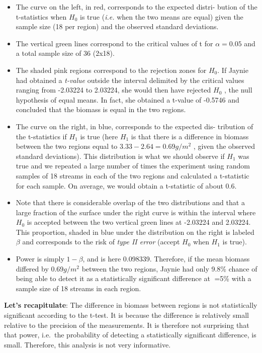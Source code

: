 \documentclass[
  12pt,
]{book}
\providecommand{\tightlist}{%
  \setlength{\itemsep}{0pt}\setlength{\parskip}{0pt}}
\begin{document}
\begin{itemize}
\tightlist
\item
  The curve on the left, in red, corresponds to the expected distri- bution of the t-statistics when \(H_0\) is true (\emph{i.e.} when the two means are equal) given the sample size (18 per region) and the observed standard deviations.
\item
  The vertical green lines correspond to the critical values of t for \(\alpha = 0.05\) and a total sample size of 36 (2x18).
\item
  The shaded pink regions correspond to the rejection zones for \(H_0\). If Jaynie had obtained a \emph{t-value} outside the interval delimited by the critical values ranging from -2.03224 to 2.03224, she would then have rejected \(H_0\) , the null hypothesis of equal means. In fact, she obtained a t-value of -0.5746 and concluded that the biomass is equal in the two regions.
\item
  The curve on the right, in blue, corresponds to the expected dis- tribution of the t-statistics if \(H_1\) is true (here \(H_1\) is that there is a difference in biomass between the two regions equal to \(3.33 - 2.64 = 0.69 g/m^2\) , given the observed standard deviations). This distribution is what we should observe if \(H_1\) was true and we repeated a large number of times the experiment using random samples of 18 streams in each of the two regions and calculated a t-statistic for each sample. On average, we would obtain a t-statistic of about 0.6.
\item
  Note that there is considerable overlap of the two distributions and that a large fraction of the surface under the right curve is within the interval where \(H_0\) is accepted between the two vertical green lines at -2.03224 and 2.03224. This proportion, shaded in blue under the distribution on the right is labeled \(\beta\) and corresponds to the risk of \emph{type II error} (accept \(H_0\) when \(H_1\) is true).
\item
  Power is simply \(1-\beta\), and is here 0.098339. Therefore, if the mean biomass differed by \(0.69 g/m^2\) between the two regions, Jaynie had only 9.8\% chance of being able to detect it as a statistically significant difference at =5\% with a sample size of 18 streams in each region.
\end{itemize}

\textbf{Let's recapitulate}: The difference in biomass between regions is not statistically significant according to the t-test. It is because the difference is relatively small relative to the precision of the measurements. It is therefore not surprising that that power, i.e.~the probability of detecting a statistically significant difference, is small. Therefore, this analysis is not very informative.
\end{document}
